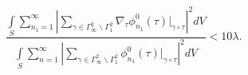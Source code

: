 \begin{equation}
\frac{\int\limits_{S}
\sum\limits^\infty_{n_{1}=1}\left|
\sum\limits_{\gamma\in\Gamma^{2}_{\infty}\backslash\Gamma^{2}_{1}}
\nabla_{\tau}\phi^0_{n_{1}}(\tau)\big|_
{\gamma\circ\tau}\right|^2 dV}
{\int\limits_S\sum\limits^\infty_{n=1}
\left|\sum\limits_{\gamma\in\Gamma^{2}_{\infty}\backslash\Gamma^{2}_{1}}
\phi^0_{n_{1}}(\tau)\big|_{\gamma\circ\tau}\right|^2 dV} < 10 \lambda.
\end{equation}

